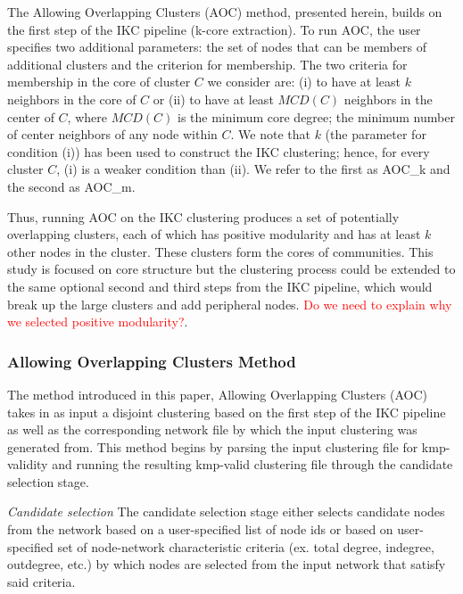 \documentclass[12pt, oneside]{article}   	%
\begin{document}
	The Allowing Overlapping Clusters (AOC) method, presented herein, builds on the first step of the IKC pipeline (k-core extraction). To run AOC, the user specifies two additional parameters:  
	the set of nodes that can be members of  additional clusters and the criterion for membership.  The two criteria for membership in the core of cluster $C$ we consider are: (i) to have at least $k$ neighbors 
	in the core of $C$ or (ii) to have at least $MCD(C)$ neighbors in the center of $C$, where $MCD(C)$ is the minimum core degree; the minimum number of center neighbors of any node within $C$. 
	We note that $k$ (the parameter for condition (i)) has been used to construct the IKC clustering; hence, for every cluster $C$,  (i) is a weaker condition than (ii).
	We refer to the first as AOC\_k and the second as AOC\_m.
	
	Thus, running   AOC on the IKC clustering produces a set of potentially overlapping clusters, each of which has positive modularity and has at least $k$ other nodes in the cluster. These clusters form the cores of communities.  This study is focused on core structure but the clustering process could be extended to the same optional second and third steps from the IKC pipeline, which would break up the large clusters and add peripheral nodes. \textcolor{red}{Do we need to explain why we selected positive modularity?}.
	
	\subsubsection{Allowing Overlapping Clusters Method}
	
	The method introduced in this paper, Allowing Overlapping Clusters (AOC) takes in as input a disjoint clustering based on the first step of the IKC pipeline as well as the corresponding network file by which the input clustering was generated from. This method begins by parsing the input clustering file for kmp-validity and running the resulting kmp-valid clustering file through the candidate selection stage. 
	
	\emph{Candidate selection} The candidate selection stage either selects candidate nodes from the network based on a user-specified list of node ids or based on user-specified set of node-network characteristic criteria (ex. total degree, indegree, outdegree, etc.) by which nodes are selected from the input network that satisfy said criteria. 
	
\end{document}
